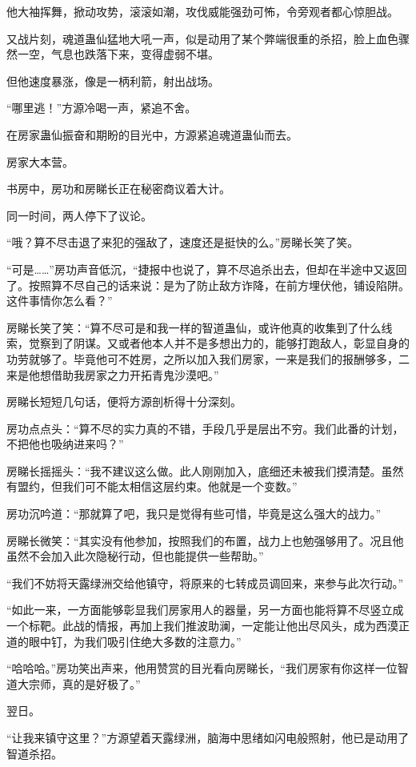 \begin{this_body}
他大袖挥舞，掀动攻势，滚滚如潮，攻伐威能强劲可怖，令旁观者都心惊胆战。

又战片刻，魂道蛊仙猛地大吼一声，似是动用了某个弊端很重的杀招，脸上血色骤然一空，气息也跌落下来，变得虚弱不堪。

但他速度暴涨，像是一柄利箭，射出战场。

“哪里逃！”方源冷喝一声，紧追不舍。

在房家蛊仙振奋和期盼的目光中，方源紧追魂道蛊仙而去。

房家大本营。

书房中，房功和房睇长正在秘密商议着大计。

同一时间，两人停下了议论。

“哦？算不尽击退了来犯的强敌了，速度还是挺快的么。”房睇长笑了笑。

“可是……”房功声音低沉，“捷报中也说了，算不尽追杀出去，但却在半途中又返回了。按照算不尽自己的话来说：是为了防止敌方诈降，在前方埋伏他，铺设陷阱。这件事情你怎么看？”

房睇长笑了笑：“算不尽可是和我一样的智道蛊仙，或许他真的收集到了什么线索，觉察到了阴谋。又或者他本人并不是多想出力的，能够打跑敌人，彰显自身的功劳就够了。毕竟他可不姓房，之所以加入我们房家，一来是我们的报酬够多，二来是他想借助我房家之力开拓青鬼沙漠吧。”

房睇长短短几句话，便将方源剖析得十分深刻。

房功点点头：“算不尽的实力真的不错，手段几乎是层出不穷。我们此番的计划，不把他也吸纳进来吗？”

房睇长摇摇头：“我不建议这么做。此人刚刚加入，底细还未被我们摸清楚。虽然有盟约，但我们可不能太相信这层约束。他就是一个变数。”

房功沉吟道：“那就算了吧，我只是觉得有些可惜，毕竟是这么强大的战力。”

房睇长微笑：“其实没有他参加，按照我们的布置，战力上也勉强够用了。况且他虽然不会加入此次隐秘行动，但也能提供一些帮助。”

“我们不妨将天露绿洲交给他镇守，将原来的七转成员调回来，来参与此次行动。”

“如此一来，一方面能够彰显我们房家用人的器量，另一方面也能将算不尽竖立成一个标靶。此战的情报，再加上我们推波助澜，一定能让他出尽风头，成为西漠正道的眼中钉，为我们吸引住绝大多数的注意力。”

“哈哈哈。”房功笑出声来，他用赞赏的目光看向房睇长，“我们房家有你这样一位智道大宗师，真的是好极了。”

翌日。

“让我来镇守这里？”方源望着天露绿洲，脑海中思绪如闪电般照射，他已是动用了智道杀招。


\end{this_body}
